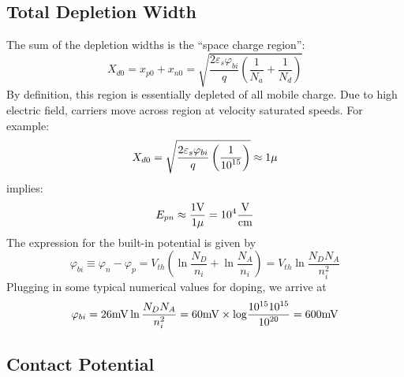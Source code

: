 \subsection{Total Depletion Width}
The sum of the depletion widths is the “space charge region”:
    \begin{equation} 
        {X_{d0}} = {x_{p0}} + {x_{n0}} = \sqrt {\frac{{2{\varepsilon _s}{\varphi _{bi}}}}{q}\left( {\frac{1}{{{N_a}}} + \frac{1}{{{N_d}}}} \right)} 
    \end{equation}
By definition, this region is essentially depleted of all mobile charge.   Due to high electric field, carriers move across region at velocity saturated speeds.  For example:
    \begin{equation} 
        {X_{d0}} = \sqrt {\frac{{2{\varepsilon _s}{\varphi _{bi}}}}{q}\left( {\frac{1}{{{{10}^{15}}}}} \right)}  \approx 1{\rm{\mu }} 
    \end{equation}
implies:
    \begin{equation} 
        {E_{pn}} \approx \frac{{1{\rm{V}}}}{{1{\rm{\mu }}}} = {10^4}\frac{{\rm{V}}}{{{\rm{cm}}}} 
    \end{equation}
The expression for the built-in potential is given by
    \begin{equation} 
        {\varphi _{bi}} \equiv {\varphi _n} - {\varphi _p} = {V_{th}}\left( {\ln \frac{{{N_D}}}{{{n_i}}} + \ln \frac{{{N_A}}}{{{n_i}}}} \right) = {V_{th}}\ln \frac{{{N_D}{N_A}}}{{n_i^2}} 
    \end{equation}
Plugging in some typical numerical values for doping, we arrive at
    \begin{equation} 
        {\varphi _{bi}} = 26{\rm{mV}}\ln \frac{{{N_D}{N_A}}}{{n_i^2}} = 60{\rm{mV}} \times {\rm{log}}\frac{{{\rm{1}}{{\rm{0}}^{{\rm{15}}}}{{10}^{15}}}}{{{{10}^{20}}}} = 600{\rm{mV}} 
    \end{equation}
\subsection{Contact Potential}
